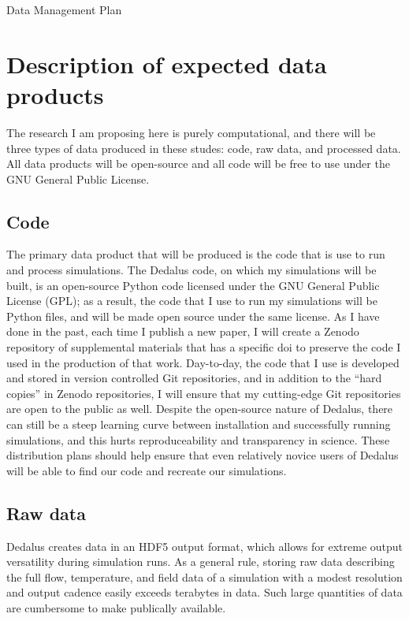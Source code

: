 \documentclass[aasms,11pt]{article}
\begin{document}
\begin{center}
\Large{Data Management Plan}
\end{center}

\section{Description of expected data products}
The research I am proposing here is purely computational, and there will be three types of data produced in these studes: code, raw data, and processed data.
All data products will be open-source and all code will be free to use under the GNU General Public License.

\subsection{Code}
The primary data product that will be produced is the code that is use to run and process simulations.
The Dedalus code, on which my simulations will be built, is an open-source Python code licensed under the GNU General Public License (GPL); as a result, the code that I use to run my simulations will be Python files, and will be made open source under the same license.
As I have done in the past, each time I publish a new paper, I will create a Zenodo repository of supplemental materials that has a specific doi to preserve the code I used in the production of that work.
Day-to-day, the code that I use is developed and stored in version controlled Git repositories, and in addition to the ``hard copies'' in Zenodo repositories, I will ensure that my cutting-edge Git repositories are open to the public as well.
Despite the open-source nature of Dedalus, there can still be a steep learning curve between installation and successfully running simulations, and this hurts reproduceability and transparency in science.
These distribution plans should help ensure that even relatively novice users of Dedalus will be able to find our code and recreate our simulations.

\subsection{Raw data}
Dedalus creates data in an HDF5 output format, which allows for extreme output versatility during simulation runs.
As a general rule, storing raw data describing the full flow, temperature, and field data of a simulation with a modest resolution and output cadence easily exceeds terabytes in data.
Such large quantities of data are cumbersome to make publically available.
\end{document}

